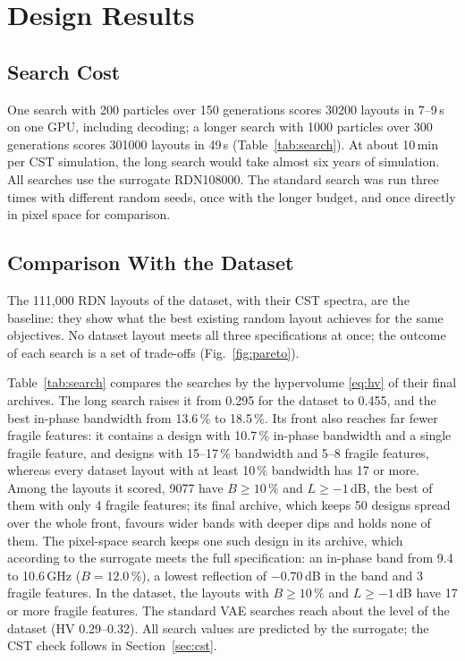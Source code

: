 \documentclass[journal]{IEEEtran}
\begin{document}
\section{Design Results}\label{sec:invresults}

\subsection{Search Cost}
One search with 200 particles over 150 generations scores \num{30200} layouts in 7--9\,s on one GPU, including decoding; a longer search with 1000 particles over 300 generations scores \num{301000} layouts in 49\,s (Table~\ref{tab:search}). At about 10\,min per CST simulation, the long search would take almost six years of simulation. All searches use the surrogate RDN108000. The standard search was run three times with different random seeds, once with the longer budget, and once directly in pixel space for comparison.

\subsection{Comparison With the Dataset}
The 111,000 RDN layouts of the dataset, with their CST spectra, are the baseline: they show what the best existing random layout achieves for the same objectives. No dataset layout meets all three specifications at once; the outcome of each search is a set of trade-offs (Fig.~\ref{fig:pareto}).

Table~\ref{tab:search} compares the searches by the hypervolume \eqref{eq:hv} of their final archives. The long search raises it from 0.295 for the dataset to 0.455, and the best in-phase bandwidth from 13.6\,\% to 18.5\,\%. Its front also reaches far fewer fragile features: it contains a design with 10.7\,\% in-phase bandwidth and a single fragile feature, and designs with 15--17\,\% bandwidth and 5--8 fragile features, whereas every dataset layout with at least 10\,\% bandwidth has 17 or more. Among the layouts it scored, \num{9077} have $B\geq10\,\%$ and $L\geq-1$\,dB, the best of them with only 4 fragile features; its final archive, which keeps 50 designs spread over the whole front, favours wider bands with deeper dips and holds none of them. The pixel-space search keeps one such design in its archive, which according to the surrogate meets the full specification: an in-phase band from 9.4 to 10.6\,GHz ($B=12.0$\,\%), a lowest reflection of $-0.70$\,dB in the band and 3 fragile features. In the dataset, the layouts with $B\geq10\,\%$ and $L\geq-1$\,dB have 17 or more fragile features. The standard VAE searches reach about the level of the dataset (HV 0.29--0.32). All search values are predicted by the surrogate; the CST check follows in Section~\ref{sec:cst}.
\end{document}
